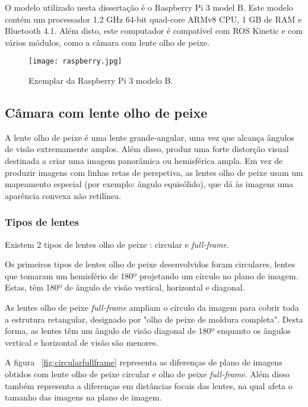O modelo utilizado nesta dissertação é o Raspberry Pi 3 model B. Este modelo contém um processador 1.2 GHz 64-bit quad-core ARMv8 CPU, 1 GB de RAM e Bluetooth 4.1. Além disto, este computador é compatível com ROS Kinetic e com vários módulos, como a câmara com lente olho de peixe.

\begin{figure}[h!] %
	\begin{center}
		\leavevmode		
		\texttt{[image: raspberry.jpg]}
		\caption{Exemplar da Raspberry Pi 3 modelo B.}
		\label{fig:raspberry}
	\end{center}
\end{figure}

\subsection{Câmara com lente olho de peixe}

A lente olho de peixe é uma lente grande-angular, uma vez que alcança ângulos de visão extremamente amplos. Além disso, produz uma forte distorção visual destinada a criar uma imagem panorâmica ou hemisférica ampla.  Em vez de produzir imagens com linhas retas de perspetiva, as lentes olho de peixe usam um mapeamento especial (por exemplo: ângulo equisólido), que dá às imagens uma aparência convexa não retilínea.

\subsubsection{Tipos de lentes}

Existem 2 tipos de lentes olho de peixe : circular e \textit{full-frame}. 

Os primeiros tipos de lentes olho de peixe desenvolvidos foram circulares, lentes que tomaram um hemisfério de 180º projetando um círculo no plano de imagem. Estas, têm 180º de ângulo de visão vertical, horizontal e diagonal. 

As lentes olho de peixe \textit{full-frame} ampliam o círculo da imagem para cobrir toda a estrutura retangular, designado por "olho de peixe de moldura completa". Desta forma, as lentes têm um ângulo de visão diagonal de 180º enquanto os ângulos vertical e horizontal de visão são menores. 

A figura ~\ref{fig:circularfullframe} representa as diferenças de plano de imagens obtidos com lente olho de peixe circular e olho de peixe \textit{full-frame}. Além disso também representa a diferenças em distâncias focais das lentes, na qual afeta o tamanho das imagens na plano de imagem.


